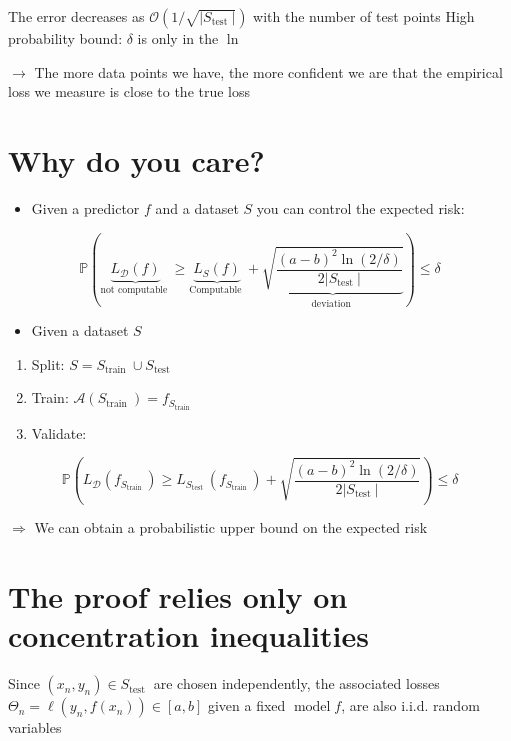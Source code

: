 The error decreases as $\mathcal{O}\left(1 / \sqrt{\left|S_{\text {test }}\right|}\right)$ with the number of test points High probability bound: $\delta$ is only in the $\ln$

$\rightarrow$ The more data points we have, the more confident we are that the empirical loss we measure is close to the true loss

\section*{Why do you care?}
\begin{itemize}
  \item Given a predictor $f$ and a dataset $S$ you can control the expected risk:
\end{itemize}

$$
\mathbb{P}(\underbrace{L_{\mathscr{D}}(f)}_{\text {not computable }} \geq \underbrace{L_{S}(f)}_{\text {Computable }}+\underbrace{\sqrt{\frac{(a-b)^{2} \ln (2 / \delta)}{2\left|S_{\text {test }}\right|}}}_{\text {deviation }}) \leq \delta
$$

\begin{itemize}
  \item Given a dataset $S$
\end{itemize}

\begin{enumerate}
  \item Split: $S=S_{\text {train }} \cup S_{\text {test }}$

  \item Train: $\mathscr{A}\left(S_{\text {train }}\right)=f_{S_{\text {train }}}$

  \item Validate:

\end{enumerate}

$$
\mathbb{P}\left(L_{\mathscr{D}}\left(f_{S_{\text {train }}}\right) \geq L_{S_{\text {test }}}\left(f_{S_{\text {train }}}\right)+\sqrt{\frac{(a-b)^{2} \ln (2 / \delta)}{2\left|S_{\text {test }}\right|}}\right) \leq \delta
$$

$\Rightarrow$ We can obtain a probabilistic upper bound on the expected risk

\section*{The proof relies only on concentration inequalities}
Since $\left(x_{n}, y_{n}\right) \in S_{\text {test }}$ are chosen independently, the associated losses $\Theta_{n}=\ell\left(y_{n}, f\left(x_{n}\right)\right) \in[a, b]$ given a fixed $\operatorname{model} f$, are also i.i.d. random variables


